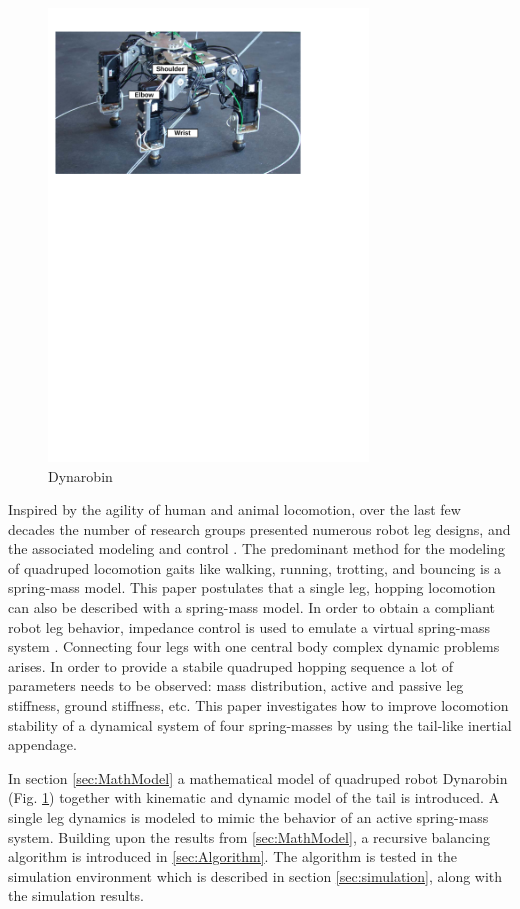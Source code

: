 \begin{figure}
	\centering
	\includegraphics[width=85mm]{./pictures/Dynarobin_introduction_image.pdf}
	\caption{Dynarobin}
	\label{fig:Dynarobin}
\end{figure}

Inspired by the agility of human and animal locomotion, over the last few decades  the number of research groups presented numerous robot leg designs, and the associated modeling and control \cite{CambridgeJournals:1345088}. The predominant method for the modeling of quadruped locomotion gaits like walking, running, trotting, and bouncing is a spring-mass model\cite{Blickhan01}. This paper postulates that a single leg, hopping locomotion can also be described with a spring-mass model. In order to obtain a compliant robot leg behavior, impedance control is used to emulate a virtual spring-mass system \cite{Havoutis01}. Connecting four legs with one central body complex dynamic problems arises. In order to provide a stabile quadruped hopping sequence a lot of parameters needs to be observed: mass distribution, active and passive leg stiffness, ground stiffness, etc. This paper investigates how to improve locomotion stability of a dynamical system of four spring-masses by using the tail-like inertial appendage. 

In section \ref{sec:MathModel} a mathematical model of quadruped robot Dynarobin (Fig. \ref{fig:Dynarobin}) together with kinematic and dynamic model of the tail is introduced. A single leg dynamics is modeled to mimic the behavior of an active spring-mass system. Building upon the results from \ref{sec:MathModel}, a recursive balancing algorithm is introduced in \ref{sec:Algorithm}. The algorithm is tested in the simulation environment which is described in section \ref{sec:simulation}, along with the simulation results. 





